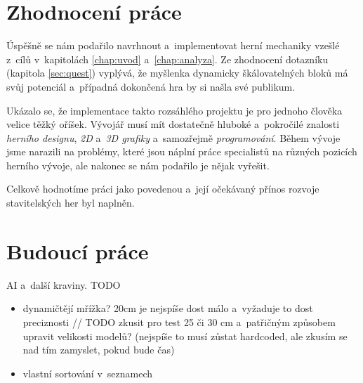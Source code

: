 \section{Zhodnocení práce}

Úspěšně se nám podařilo navrhnout a~implementovat herní mechaniky vzešlé z~cílů v~kapitolách \ref{chap:uvod} a~\ref{chap:analyza}. Ze zhodnocení dotazníku (kapitola \ref{sec:quest}) vyplývá, že myšlenka dynamicky škálovatelných bloků má svůj potenciál a~případná dokončená hra by si našla své publikum.

Ukázalo se, že implementace takto rozsáhlého projektu je pro jednoho člověka velice těžký oříšek. Vývojář musí mít dostatečně hluboké a~pokročilé znalosti \textit{herního designu}, \textit{2D} a~\textit{3D grafiky} a~samozřejmě \textit{programování}. Během vývoje jsme narazili na problémy, které jsou náplní práce specialistů na různých pozicích herního vývoje, ale nakonec se nám podařilo je nějak vyřešit.

Celkově hodnotíme práci jako povedenou a~její očekávaný přínos rozvoje stavitelských her byl naplněn.





\section{Budoucí práce}

AI a~další kraviny. TODO

\begin{itemize}
	\item dynamičtějí mřížka? 20cm je nejspíše dost málo a~vyžaduje to dost preciznosti // TODO zkusit pro test 25 či 30 cm a~patřičným způsobem upravit velikosti modelů? (nejspíše to musí zůstat hardcoded, ale zkusím se nad tím zamyslet, pokud bude čas)
	\item vlastní sortování v~seznamech

\end{itemize}


